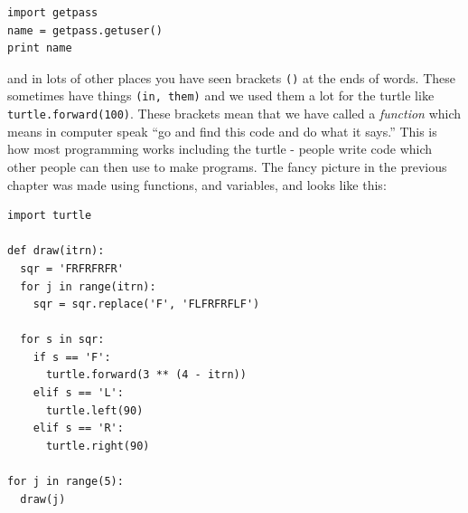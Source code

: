 \documentclass[a4paper, 11pt]{book}
\begin{document}
{\small
\begin{verbatim}
import getpass
name = getpass.getuser()
print name
\end{verbatim}
}

\noindent
and in lots of other places you have seen brackets \verb|()| at the
ends of words. These sometimes have things \verb|(in, them)| and we
used them a lot for the turtle like \verb|turtle.forward(100)|. These
brackets mean that we have called a \emph{function} which means in
computer speak ``go and find this code and do what it says.'' This is
how most programming works including the turtle - people write code
which other people can then use to make programs. The fancy picture in
the previous chapter was made using functions, and variables, and
looks like this:

{\small
\begin{verbatim}
import turtle

def draw(itrn):
  sqr = 'FRFRFRFR'
  for j in range(itrn):
    sqr = sqr.replace('F', 'FLFRFRFLF')
    
  for s in sqr:
    if s == 'F':
      turtle.forward(3 ** (4 - itrn))
    elif s == 'L':
      turtle.left(90)
    elif s == 'R':
      turtle.right(90)

for j in range(5):
  draw(j)
\end{verbatim}
}
\end{document}
